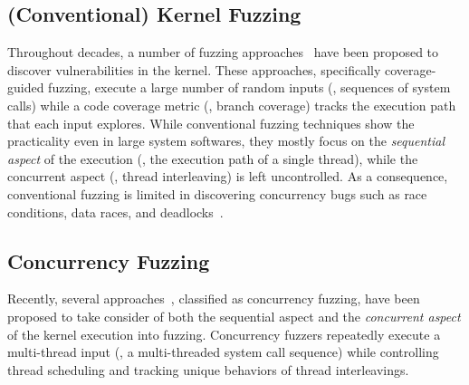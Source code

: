 
\subsection{(Conventional) Kernel Fuzzing}
\label{ss:kernelfuzzing}

Throughout decades, a number of fuzzing approaches~\cite{imf,
  syzkaller, moonshine, hfl, healer, janus, hydra, trinity} have been
proposed to discover vulnerabilities in the kernel.
%
These approaches, specifically coverage-guided fuzzing, execute a
large number of random inputs (\ie, sequences of system calls) while a
code coverage metric (\eg, branch coverage) tracks the execution path
that each input explores.
%
While conventional fuzzing techniques show the practicality even in
large system softwares, they mostly focus on the \textit{sequential
  aspect} of the execution (\ie, the execution path of a single
thread), while the concurrent aspect (\ie, thread interleaving) is
left uncontrolled.
%
As a consequence, conventional fuzzing is limited in discovering
concurrency bugs such as race conditions, data races, and
deadlocks~\cite{covcon, terragni2018effectiveness}.





\subsection{Concurrency Fuzzing}
\label{ss:concurrencyfuzzing}





Recently, several approaches~\cite{razzer, krace, snowboard, muzz,
  conzzer}, classified as concurrency fuzzing, have been proposed to
take consider of both the sequential aspect and the
\textit{concurrent aspect} of the kernel execution into fuzzing.
%
Concurrency fuzzers repeatedly execute a multi-thread input (\eg, a
multi-threaded system call sequence) while controlling thread
scheduling and tracking unique behaviors of thread interleavings.


